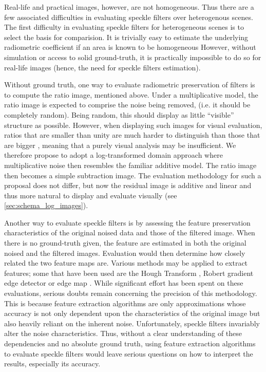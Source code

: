 \documentclass[journal]{IEEEtran}
\begin{document}
Real-life and practical images, however, are not homogeneous.
Thus there are a few associated difficulties in evaluating speckle filters over heterogenous scenes.
The first difficulty in evaluating speckle filters for heterogeneous scenes is to select the basis for comparision. 
It is trivially easy to estimate the underlying radiometric coefficient if an area is known to be homogeneous
However, without simulation or access to solid ground-truth, it is practically impossible to do so for real-life images (hence, the need for speckle filters estimation).

Without ground truth, one way to evaluate radiometric preservation of filters is to compute the ratio image, mentioned above. 
Under a multiplicative model, the ratio image is expected to comprise the noise being removed, (i.e. it should be completely random). 
Being random, this should display as little ``visible'' structure as possible. 
However, when displaying such images for visual evaluation, ratios that are smaller than unity are much harder to distinguish than those that are bigger \cite{Medeiros_2003_IJRS}, meaning that a purely visual analysis may be insufficient.
We therefore propose to adopt a log-transformed domain approach where multiplicative noise then resembles the familiar additive model.
The ratio image then becomes a simple subtraction image.
The evaluation methodology for such a proposal does not differ, but now the residual image is additive and linear and thus more natural to display and evaluate visually (see \ref{sec:schema_log_images}).

Another way to evaluate speckle filters is by assessing the feature preservation characteristics of the original noised data and those of the filtered image. 
When there is no ground-truth given, the feature are estimated in both the original noised and the filtered images.
Evaluation would then determine how closely related the two feature maps are. 
Various methods may be applied to extract features; some that have been used are the Hough Transform \cite{Medeiros_2003_IJRS}, Robert gradient edge detector \cite{Gagnon_SPIEProc_1997} or edge map \cite{Frost_PAMI_1982}.
While significant effort has been spent on these evaluations, serious doubts remain concerning the precision of this methodology.
This is because feature extraction algorithms are only approximations 
	whose accuracy is 
		not only dependent upon the characteristics of the original image 
		but also heavily reliant on the inherent noise.
Unfortunately, speckle filters invariably alter the noise characteristics.
Thus, without a clear understanding of these dependencies and no absolute ground truth, 
	using feature extraction algorithms to evaluate speckle filters would leave serious questions on how to interpret the results, especially its accuracy.
\end{document}
